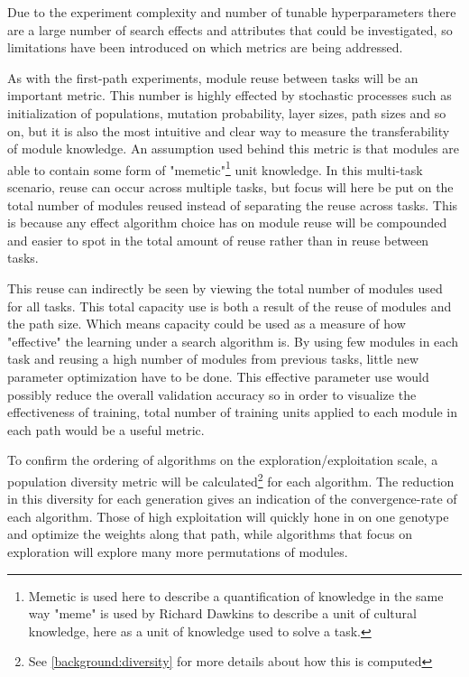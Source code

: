 Due to the experiment complexity and number of tunable hyperparameters there are a large number of search effects and attributes that could be investigated, so limitations have been introduced on which metrics are being addressed. 

As with the first-path experiments, module reuse between tasks will be an important metric. This number is highly effected by stochastic processes such as initialization of populations, mutation probability, layer sizes, path sizes and so on, but it is also the most intuitive and clear way to measure the transferability of module knowledge. An assumption used behind this metric is that modules are able to contain some form of "memetic"\footnote{Memetic is used here to describe a quantification of knowledge in the same way "meme" is used by Richard Dawkins\cite{selfishGene} to describe a unit of cultural knowledge, here as a unit of knowledge used to solve a task.} unit knowledge. In this multi-task scenario, reuse can occur across multiple tasks, but focus will here be put on the total number of modules reused instead of separating the reuse across tasks. This is because any effect algorithm choice has on module reuse will be compounded and easier to spot in the total amount of reuse rather than in reuse between tasks.

This reuse can indirectly be seen by viewing the total number of modules used for all tasks. This total capacity use is both a result of the reuse of modules and the path size. Which means capacity could be used as a measure of how "effective" the learning under a search algorithm is. By using few modules in each task and reusing a high number of modules from previous tasks, little new parameter optimization have to be done. This effective parameter use would possibly reduce the overall validation accuracy so in order to visualize the effectiveness of training, total number of training units applied to each module in each path would be a useful metric. 

To confirm the ordering of algorithms on the exploration/exploitation scale, a population diversity metric will be calculated\footnote{See \ref{background:diversity} for more details about how this is computed} for each algorithm. The reduction in this diversity for each generation gives an indication of the convergence-rate of each algorithm. Those of high exploitation will quickly hone in on one genotype and optimize the weights along that path, while algorithms that focus on exploration will explore many more permutations of modules. 

